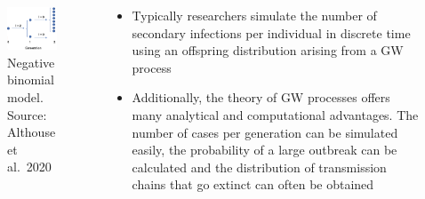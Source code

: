 \documentclass[
  ignorenonframetext,
]{beamer}
\providecommand{\tightlist}{%
  \setlength{\itemsep}{0pt}\setlength{\parskip}{0pt}}
\begin{document}
\begin{frame}{}
\protect\hypertarget{section}{}
\begin{columns}[T]
\begin{column}{0.4\textwidth}
\begin{figure}
\centering
\includegraphics{Althouseetal2020BranchingProcess.png}
\caption{Negative binomial model. Source: Althouse et al.~2020}
\end{figure}
\end{column}

\begin{column}{0.6\textwidth}
\begin{itemize}
\tightlist
\item
  Typically researchers simulate the number of secondary infections per
  individual in discrete time using an offspring distribution arising
  from a GW process
\item
  Additionally, the theory of GW processes offers many analytical and
  computational advantages. The number of cases per generation can be
  simulated easily, the probability of a large outbreak can be
  calculated and the distribution of transmission chains that go extinct
  can often be obtained
\end{itemize}
\end{column}
\end{columns}
\end{frame}
\end{document}
